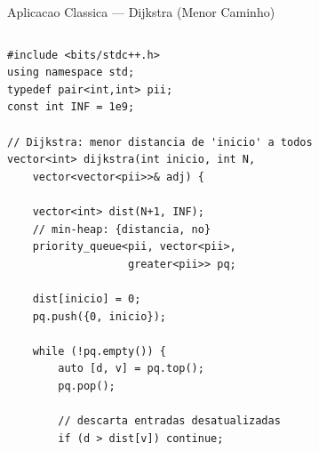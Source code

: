 \documentclass[aspectratio=169,11pt]{beamer}
\begin{document}
\begin{frame}[fragile,shrink=8]{Aplicacao Classica --- Dijkstra (Menor Caminho)}
  \begin{columns}[t]
      \begin{tcolorbox}[caixaCodigo]
        \begin{lstlisting}[style=cppsmall]
#include <bits/stdc++.h>
using namespace std;
typedef pair<int,int> pii;
const int INF = 1e9;

// Dijkstra: menor distancia de 'inicio' a todos
vector<int> dijkstra(int inicio, int N,
    vector<vector<pii>>& adj) {

    vector<int> dist(N+1, INF);
    // min-heap: {distancia, no}
    priority_queue<pii, vector<pii>,
                   greater<pii>> pq;

    dist[inicio] = 0;
    pq.push({0, inicio});

    while (!pq.empty()) {
        auto [d, v] = pq.top();
        pq.pop();

        // descarta entradas desatualizadas
        if (d > dist[v]) continue;


\end{lstlisting}
\end{tcolorbox}
\end{columns}
\end{frame}
\end{document}
